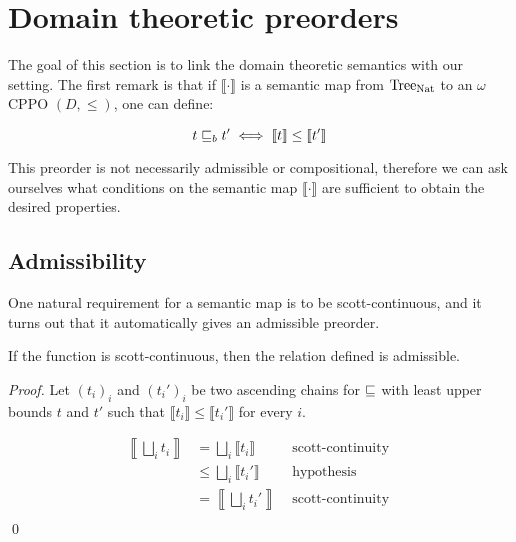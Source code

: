
\section{Domain theoretic preorders}

The goal of this section is to link the domain theoretic semantics 
with our setting. The first remark is that if 
$\llbracket \cdot \rrbracket$ is a semantic map from $\textnormal{Tree}_{\textnormal{Nat}}$ to 
an $\omega$CPPO $(D,\leq)$, one can define:

\begin{equation*}
    t \sqsubseteq_b t' \iff \llbracket t \rrbracket \leq \llbracket t' \rrbracket 
\end{equation*}

This preorder is not necessarily admissible or compositional, therefore 
we can ask ourselves what conditions on the semantic map $\llbracket \cdot
\rrbracket$ are sufficient to obtain the desired properties.


\subsection{Admissibility}


One natural requirement for a semantic map is to be scott-continuous, and 
it turns out that it automatically gives an admissible preorder.

\begin{lemma}[Admissibility]
    \label{lem:continuousadm}
    If the function is scott-continuous, then the relation defined 
    is admissible.
\end{lemma}


\begin{proof}
    Let $(t_i)_i$ and $(t_i')_i$ be two ascending chains for $\sqsubseteq$
    with least upper bounds $t$ and $t'$ such that $\llbracket t_i \rrbracket
    \leq \llbracket t_i' \rrbracket$ for every $i$.

    \begin{align*}
        \left\llbracket \bigsqcup_i t_i \right\rrbracket &= \bigsqcup_i \llbracket t_i
        \rrbracket & \text{ scott-continuity } \\
                   &\leq \bigsqcup_i \llbracket t_i' \rrbracket & 
                    \text{ hypothesis } \\
                   &= \left\llbracket \bigsqcup_i t_i' \right\rrbracket &
                    \text{ scott-continuity } \\
    \end{align*}
\qed\end{proof}



